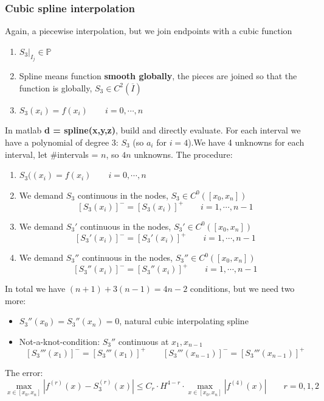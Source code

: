     \subsubsection{Cubic spline interpolation}
    Again, a piecewise interpolation, but we join endpoints with a cubic function
    \begin{enumerate}
        \item $S_3\Big|_{I_j}\in\mathbb{P}$
        \item Spline means function \textbf{smooth globally}, the pieces are joined so that the function is globally, $S_3\in C^2(\overline{I})$
        \item $S_3(x_i)=f(x_i)\qquad i=0,\cdots,n$
    \end{enumerate}
    In matlab \textbf{d = spline(x,y,z)}, build and directly evaluate. For each interval we have a polynomial of degree 3: $S_3$ (so $a_i$ for $i=4$).We have 4 unknowns for each interval, let \#intervals = $n$, so $4n$ unknowns. The procedure:
    \begin{enumerate}[1)]
        \item $S_3((x_i)=f(x_i)\qquad i=0,\cdots,n$
        \item We demand $S_3$ continuous in the nodes, $S_3\in C^0\left(\left[
            x_0,x_n
        \right]\right)$
        $$
        \left[S_3(x_i)\right]^-=
        \left[S_3(x_i)\right]^+
        \qquad i=1,\cdots,n-1
        $$
        \item We demand $S_3'$ continuous in the nodes, $S_3'\in C^0\left(\left[
            x_0,x_n
        \right]\right)$
        $$
        \left[S_3'(x_i)\right]^-=
        \left[S_3'(x_i)\right]^+
        \qquad i=1,\cdots,n-1
        $$
        \item We demand $S_3''$ continuous in the nodes, $S_3''\in C^0\left(\left[
            x_0,x_n
        \right]\right)$
        $$
        \left[S_3''(x_i)\right]^-=
        \left[S_3''(x_i)\right]^+
        \qquad i=1,\cdots,n-1
        $$
    \end{enumerate}
    In total we have $(n+1)+3(n-1)=4n-2$ conditions, but we need two more:
    \begin{itemize}
        \item $S_3''(x_0)=S_3''(x_n)=0$, natural cubic interpolating spline
        \item Not-a-knot-condition: $S_3''$ continuous at $x_1,x_{n-1}$
        $$
        \left[
            S_3'''(x_1)
        \right]^-=
        \left[
            S_3'''(x_1)
        \right]^+
        \qquad
        \left[
            S_3'''(x_{n-1})
        \right]^-=
        \left[
            S_3'''(x_{n-1})
        \right]^+
        $$
    \end{itemize}
    The error:
    $$
    \max_{x\in\left[x_0,x_n\right]}
    \left|
        f^{(r)}(x)-
        S_3^{(r)}(x)
    \right|\leq
    C_r\cdot
    H^{4-r}\cdot
    \max_{x\in\left[x_0,x_n\right]}
    \left|
        f^{(4)}(x)
    \right|
    \qquad r=0,1,2
    $$

